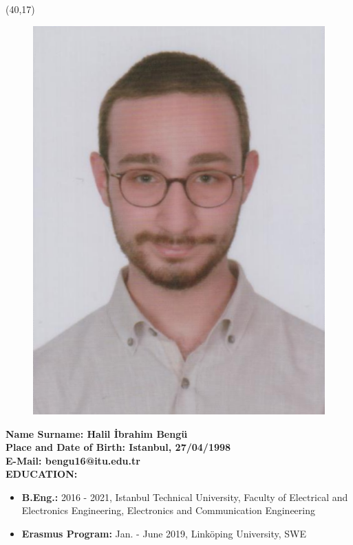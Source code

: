 \begin{textblock}{1}(40,17)
  \begin{figure}[p]
    \includegraphics[scale=0.25,keepaspectratio=true]{figures/vesikalik-enes.png}
  \end{figure}

\end{textblock}
\textbf{Name Surname: {\normalfont Halil İbrahim Bengü}} \\

\vspace{-3mm}
\textbf{Place and Date of Birth: {\normalfont Istanbul, 27/04/1998}} \\

\vspace{-3mm}
\textbf{E-Mail: {\normalfont bengu16@itu.edu.tr}} \\


\textbf{EDUCATION:}
\vspace{-3mm}
\begin{itemize}
  \item \textbf{B.Eng.:} 2016 - 2021, Istanbul Technical University, Faculty of Electrical and Electronics Engineering, Electronics and Communication Engineering
  \item \textbf{Erasmus Program:} Jan. - June 2019, Linköping University, SWE
\end{itemize}

